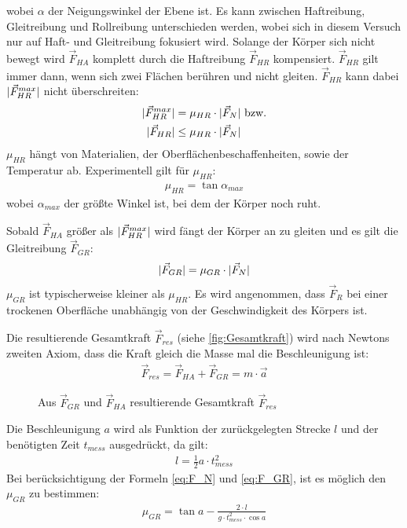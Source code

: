 wobei $\alpha$ der Neigungswinkel der Ebene ist.
Es kann zwischen Haftreibung, Gleitreibung und Rollreibung unterschieden werden, wobei sich in diesem Versuch nur auf Haft- und Gleitreibung fokusiert wird.
\newline
Solange der Körper sich nicht bewegt wird $\vec{F}_{HA}$ komplett durch die Haftreibung $\vec{F}_{HR}$ kompensiert. $\vec{F}_{HR}$ gilt immer dann, wenn sich zwei Flächen berühren und nicht gleiten. $\vec{F}_{HR}$ kann dabei $\lvert\vec{F}_{HR}^{max}\rvert$ nicht überschreiten:
\begin{subequations}
    \begin{align}
        \lvert\vec{F}_{HR}^{max}\rvert &= \mu_{HR} \cdot \lvert\vec{F}_{N}\rvert \text{ bzw.}\\
        \lvert\vec{F}_{HR}\rvert &\leq \mu_{HR} \cdot \lvert\vec{F}_{N}\rvert
    \end{align}
    \label{eq:F_HR}
\end{subequations}
$\mu_{HR}$ hängt von Materialien, der Oberflächenbeschaffenheiten, sowie der Temperatur ab. \newline
Experimentell gilt für $\mu_{HR}$:
\begin{align}
    \mu_{HR} = \tan{\alpha_{max}}
    \label{eq:MU_HR}
\end{align}
wobei $\alpha_{max}$ der größte Winkel ist, bei dem der Körper noch ruht.\newline

Sobald $\vec{F}_{HA}$ größer als $\lvert\vec{F}_{HR}^{max}\rvert$ wird fängt der Körper an zu gleiten und es gilt die Gleitreibung $\vec{F}_{GR}$:
\begin{align}
    \lvert\vec{F}_{GR}\rvert = \mu_{GR} \cdot \lvert\vec{F}_{N}\rvert
    \label{eq:F_GR}
\end{align}
$\mu_{GR}$ ist typischerweise kleiner als $\mu_{HR}$. Es wird angenommen, dass $\vec{F}_{R}$ bei einer trockenen Oberfläche unabhängig von der Geschwindigkeit des Körpers ist.\smallskip

Die resultierende Gesamtkraft $\vec{F}_{res}$ (siehe \autoref{fig:Gesamtkraft}) wird nach Newtons zweiten Axiom, dass die Kraft gleich die Masse mal die Beschleunigung ist:
\begin{align}
    \vec{F}_{res} = \vec{F}_{HA} + \vec{F}_{GR} = m \cdot \vec{a}
\end{align}

\begin{figure}[ht]
    \centering
    
    \caption[Resultierende Gesamtkraft]{Aus $\vec{F}_{GR}$ und $\vec{F}_{HA}$ resultierende Gesamtkraft $\vec{F}_{res}$}
    \label{fig:Gesamtkraft}
\end{figure}

Die Beschleunigung $a$ wird als Funktion der zurückgelegten Strecke $l$ und der benötigten Zeit $t_{mess}$ ausgedrückt, da gilt:
\begin{align}
    l = \frac{1}{2} a \cdot t_{mess}^2
\end{align}
Bei berücksichtigung der Formeln \autoref{eq:F_N} und \autoref{eq:F_GR}, ist es möglich den $\mu_{GR}$ zu bestimmen:
\begin{align}
    \mu_{GR} = \tan{a} - \frac{2\cdot l}{g \cdot t_{mess}^2 \cdot \cos{a}}
\end{align}